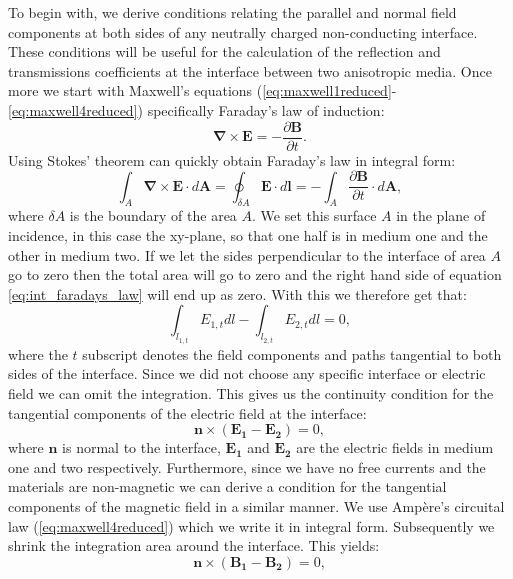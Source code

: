 To begin with, we derive conditions relating the parallel and normal field components at both sides of any neutrally charged non-conducting interface. These conditions will be useful for the calculation of the reflection and transmissions coefficients at the interface between two anisotropic media. Once more we start with Maxwell's equations (\ref{eq:maxwell1reduced}-\ref{eq:maxwell4reduced}) specifically Faraday's law of induction:
\begin{equation}
    \bm{\nabla}\times\bm{E} =-\frac{\partial\bm{B}}{\partial t}.
\end{equation}
Using Stokes' theorem can quickly obtain Faraday's law in integral form:
\begin{equation}
    \label{eq:int_faradays_law}
    \int_A \bm{\nabla}\times\bm{E}\cdot d\bm{A} = \oint_{\delta A} \bm{E}\cdot d \bm{l} = -\int_A \frac{\partial\bm{B}}{\partial t}\cdot d\bm{A},
\end{equation}
where $\delta A$ is the boundary of the area $A$. We set this surface $A$ in the plane of incidence, in this case the xy-plane, so that one half is in medium one and the other in medium two. If we let the sides perpendicular to the interface of area $A$ go to zero then the total area will go to zero and the right hand side of equation \ref{eq:int_faradays_law} will end up as zero. With this we therefore get that:
\begin{equation}
    \int_{l_{1,t}} E_{1,t} dl - \int_{l_{2,t}} E_{2,t} dl = 0,
\end{equation}
where the $t$ subscript denotes the field components and paths tangential to both sides of the interface. Since  we did not choose any specific interface or electric field we can omit the integration. This gives us the continuity condition for the tangential components of the electric field at the interface:
\begin{equation}
    \label{eq:t_boundary_cond_e}
    \bm{n} \times (\bm{E_1} - \bm{E_2}) = 0,
\end{equation}
where $\bm{n}$ is normal to the interface, $\bm{E_1}$ and $\bm{E_2}$ are the electric fields in medium one and two respectively. Furthermore, since we have no free currents and the materials are non-magnetic we can derive a condition for the tangential components of the magnetic field in a similar manner. We use Ampère's circuital law (\ref{eq:maxwell4reduced}) which we write it in integral form. Subsequently we shrink the integration area around the interface. This yields:
\begin{equation}
    \label{eq:t_boundary_cond_b}
    \bm{n} \times (\bm{B_1} - \bm{B_2}) = 0,
\end{equation}
